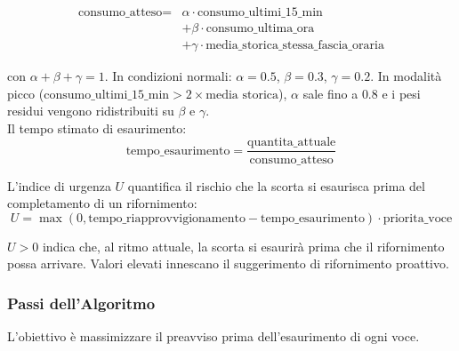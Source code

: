 \begin{equation}
\begin{aligned}
\text{consumo\_atteso} ={}& \alpha \cdot \text{consumo\_ultimi\_15\_min} \\
&+ \beta \cdot \text{consumo\_ultima\_ora} \\
&+ \gamma \cdot \text{media\_storica\_stessa\_fascia\_oraria}
\end{aligned}
\end{equation}

con $\alpha + \beta + \gamma = 1$. In condizioni normali: $\alpha = 0.5$, $\beta = 0.3$, $\gamma = 0.2$. In modalità picco ($\text{consumo\_ultimi\_15\_min} > 2 \times \text{media storica}$), $\alpha$ sale fino a $0.8$ e i pesi residui vengono ridistribuiti su $\beta$ e $\gamma$.
\\
Il tempo stimato di esaurimento:
$$ \text{tempo\_esaurimento} = \frac{\text{quantita\_attuale}}{\text{consumo\_atteso}} $$

L'indice di urgenza $U$ quantifica il rischio che la scorta si esaurisca prima del completamento di un rifornimento:
$$ U = \max(0, \text{tempo\_riapprovvigionamento} - \text{tempo\_esaurimento}) \cdot \text{priorita\_voce} $$

$U > 0$ indica che, al ritmo attuale, la scorta si esaurirà prima che il rifornimento possa arrivare. Valori elevati innescano il suggerimento di rifornimento proattivo.

\subsubsection*{Passi dell'Algoritmo}
L'obiettivo è massimizzare il preavviso prima dell'esaurimento di ogni voce.

